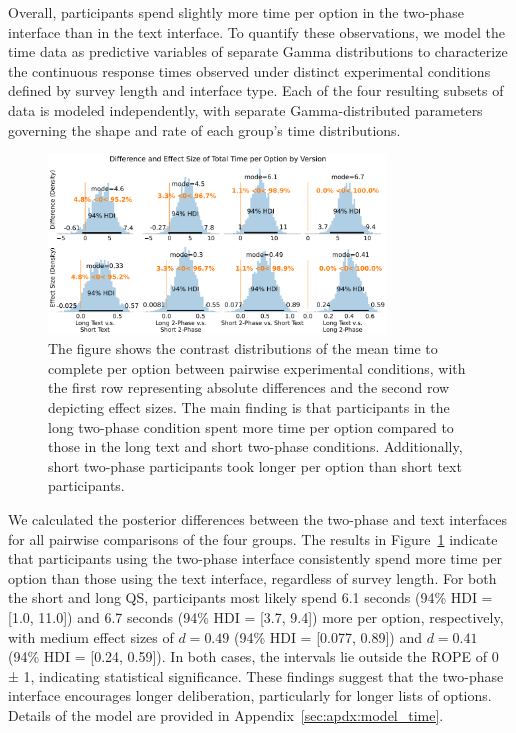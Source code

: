 Overall, participants spend slightly more time per option in the two-phase interface than in the text interface. To quantify these observations, we model the time data as predictive variables of separate Gamma distributions to characterize the continuous response times observed under distinct experimental conditions defined by survey length and interface type. Each of the four resulting subsets of data is modeled independently, with separate Gamma-distributed parameters governing the shape and rate of each group's time distributions. 

\begin{figure}[h]
    \centering
    \includegraphics[width=0.8\textwidth]{content/image/time/time_diff_per_option_effect_size_by_version}
    \captionsetup{width=0.8\textwidth, justification=justified}
    \caption{The figure shows the contrast distributions of the mean time to complete per option between pairwise experimental conditions, with the first row representing absolute differences and the second row depicting effect sizes. The main finding is that participants in the long two-phase condition spent more time per option compared to those in the long text and short two-phase conditions. Additionally, short two-phase participants took longer per option than short text participants.}
    \label{fig:time_per_option_bayesian}
\end{figure}

We calculated the posterior differences between the two-phase and text interfaces for all pairwise comparisons of the four groups. The results in Figure~\ref{fig:time_per_option_bayesian} indicate that participants using the two-phase interface consistently spend more time per option than those using the text interface, regardless of survey length. For both the short and long QS, participants most likely spend 6.1 seconds (94\% HDI = [1.0, 11.0]) and 6.7 seconds (94\% HDI = [3.7, 9.4]) more per option, respectively, with medium effect sizes of $d=0.49$ (94\% HDI = [0.077, 0.89]) and $d=0.41$ (94\% HDI = [0.24, 0.59]). In both cases, the intervals lie outside the ROPE of 0 ± 1, indicating statistical significance. These findings suggest that the two-phase interface encourages longer deliberation, particularly for longer lists of options. Details of the model are provided in Appendix~\ref{sec:apdx:model_time}.

